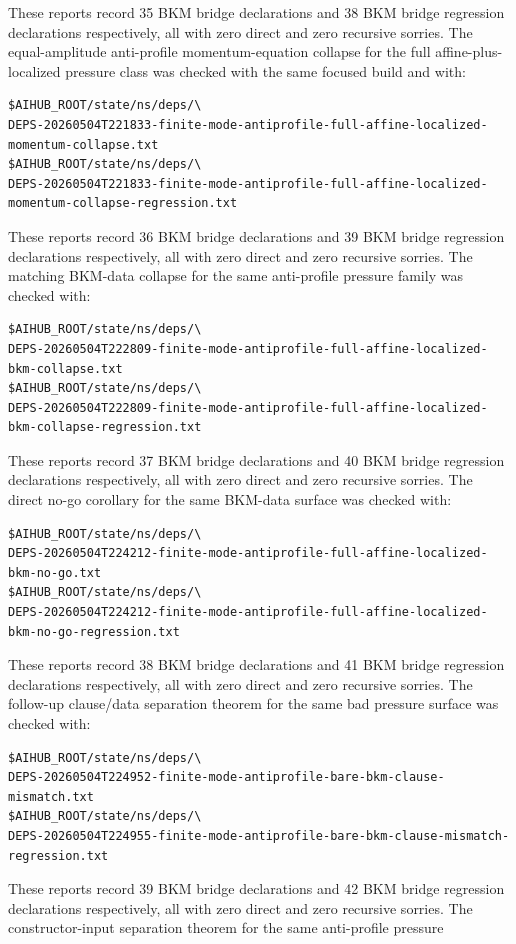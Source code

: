 \documentclass[11pt]{article}
\begin{document}
These reports record 35 BKM bridge declarations and 38 BKM bridge regression
declarations respectively, all with zero direct and zero recursive sorries.
The equal-amplitude anti-profile momentum-equation collapse for the full
affine-plus-localized pressure class was checked with the same focused build
and with:
\begin{verbatim}
$AIHUB_ROOT/state/ns/deps/\
DEPS-20260504T221833-finite-mode-antiprofile-full-affine-localized-momentum-collapse.txt
$AIHUB_ROOT/state/ns/deps/\
DEPS-20260504T221833-finite-mode-antiprofile-full-affine-localized-momentum-collapse-regression.txt
\end{verbatim}
These reports record 36 BKM bridge declarations and 39 BKM bridge regression
declarations respectively, all with zero direct and zero recursive sorries.
The matching BKM-data collapse for the same anti-profile pressure family was
checked with:
\begin{verbatim}
$AIHUB_ROOT/state/ns/deps/\
DEPS-20260504T222809-finite-mode-antiprofile-full-affine-localized-bkm-collapse.txt
$AIHUB_ROOT/state/ns/deps/\
DEPS-20260504T222809-finite-mode-antiprofile-full-affine-localized-bkm-collapse-regression.txt
\end{verbatim}
These reports record 37 BKM bridge declarations and 40 BKM bridge regression
declarations respectively, all with zero direct and zero recursive sorries.
The direct no-go corollary for the same BKM-data surface was checked with:
\begin{verbatim}
$AIHUB_ROOT/state/ns/deps/\
DEPS-20260504T224212-finite-mode-antiprofile-full-affine-localized-bkm-no-go.txt
$AIHUB_ROOT/state/ns/deps/\
DEPS-20260504T224212-finite-mode-antiprofile-full-affine-localized-bkm-no-go-regression.txt
\end{verbatim}
These reports record 38 BKM bridge declarations and 41 BKM bridge regression
declarations respectively, all with zero direct and zero recursive sorries.
The follow-up clause/data separation theorem for the same bad pressure surface
was checked with:
\begin{verbatim}
$AIHUB_ROOT/state/ns/deps/\
DEPS-20260504T224952-finite-mode-antiprofile-bare-bkm-clause-mismatch.txt
$AIHUB_ROOT/state/ns/deps/\
DEPS-20260504T224955-finite-mode-antiprofile-bare-bkm-clause-mismatch-regression.txt
\end{verbatim}
These reports record 39 BKM bridge declarations and 42 BKM bridge regression
declarations respectively, all with zero direct and zero recursive sorries.
The constructor-input separation theorem for the same anti-profile pressure
\end{document}

